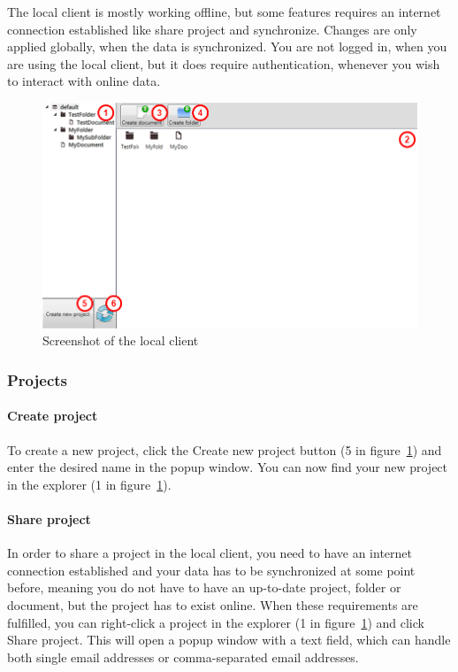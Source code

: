 The local client is mostly working offline, but some features requires an internet connection established like share project and synchronize. Changes are only applied globally, when the data is synchronized.
You are not logged in, when you are using the local client, but it does require authentication, whenever you wish to interact with online data.

\begin{figure}[htb]
	\centering
	\includegraphics[width=1\textwidth]{User_manual/graphics/local.png}
	\caption{Screenshot of the local client}
	\label{fig:manual-local}
\end{figure}

\subsubsection{Projects}

	\paragraph{Create project}
	To create a new project, click the Create new project button (5 in figure~\ref{fig:manual-local}) and enter the desired name in the popup window. You can now find your new project in the explorer (1 in figure~\ref{fig:manual-local}).

	\paragraph{Share project}
	In order to share a project in the local client, you need to have an internet connection established and your data has to be synchronized at some point before, meaning you do not have to have an up-to-date project, folder or document, but the project has to exist online. When these requirements are fulfilled, you can right-click a project in the explorer (1 in figure~\ref{fig:manual-local}) and click Share project. This will open a popup window with a text field, which can handle both single email addresses or comma-separated email addresses.


